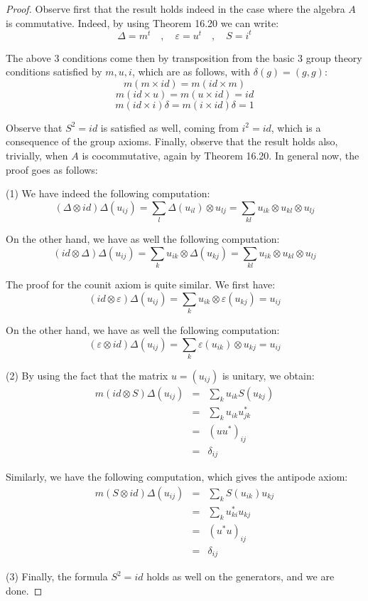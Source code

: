 \documentclass[12pt]{amsbook}
\begin{document}
\begin{proof}
Observe first that the result holds indeed in the case where the algebra $A$ is commutative. Indeed, by using Theorem 16.20 we can write:
$$\Delta=m^t\quad,\quad
\varepsilon=u^t\quad,\quad
S=i^t$$

The above 3 conditions come then by transposition from the basic 3 group theory conditions satisfied by $m,u,i$, which are as follows, with $\delta(g)=(g,g)$:
$$m(m\times id)=m(id\times m)$$
$$m(id\times u)=m(u\times id)=id$$
$$m(id\times i)\delta=m(i\times id)\delta=1$$

Observe that $S^2=id$ is satisfied as well, coming from $i^2=id$, which is a consequence of the group axioms. Finally, observe that the result holds also, trivially, when $A$ is cocommutative, again by Theorem 16.20. In general now, the proof goes as follows:

\medskip

(1) We have indeed the following computation:
$$(\Delta\otimes id)\Delta(u_{ij})
=\sum_l\Delta(u_{il})\otimes u_{lj}
=\sum_{kl}u_{ik}\otimes u_{kl}\otimes u_{lj}$$

On the other hand, we have as well the following computation:
$$(id\otimes\Delta)\Delta(u_{ij})
=\sum_ku_{ik}\otimes\Delta(u_{kj})
=\sum_{kl}u_{ik}\otimes u_{kl}\otimes u_{lj}$$

The proof for the counit axiom is quite similar. We first have:
$$(id\otimes\varepsilon)\Delta(u_{ij})
=\sum_ku_{ik}\otimes\varepsilon(u_{kj})
=u_{ij}$$

On the other hand, we have as well the following computation:
$$(\varepsilon\otimes id)\Delta(u_{ij})
=\sum_k\varepsilon(u_{ik})\otimes u_{kj}
=u_{ij}$$

(2) By using the fact that the matrix $u=(u_{ij})$ is unitary, we obtain:
\begin{eqnarray*}
m(id\otimes S)\Delta(u_{ij})
&=&\sum_ku_{ik}S(u_{kj})\\
&=&\sum_ku_{ik}u_{jk}^*\\
&=&(uu^*)_{ij}\\
&=&\delta_{ij}
\end{eqnarray*}

Similarly, we have the following computation, which gives the antipode axiom:
\begin{eqnarray*}
m(S\otimes id)\Delta(u_{ij})
&=&\sum_kS(u_{ik})u_{kj}\\
&=&\sum_ku_{ki}^*u_{kj}\\
&=&(u^*u)_{ij}\\
&=&\delta_{ij}
\end{eqnarray*}

(3) Finally, the formula $S^2=id$ holds as well on the generators, and we are done.
\end{proof}
\end{document}
